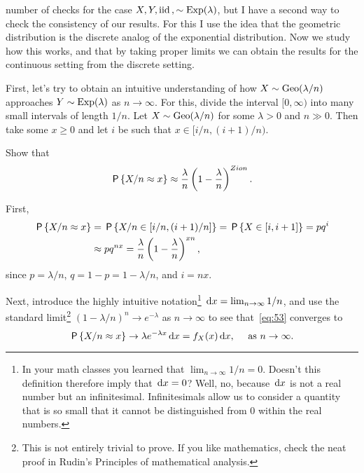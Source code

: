  number of checks for the case $X, Y, \iid, \sim\Exp{\lambda}$,
but I have a second way to check the  consistency of our results.
For this I use the idea that the geometric distribution is the discrete analog of the exponential distribution.
Now we study how this works, and that by taking proper limits we can obtain the results for the continuous setting from the discrete setting.

First, let's try to obtain an intuitive understanding of how $X\sim \Geo{\lambda/n}$ approaches  $Y\sim\Exp{\lambda}$ as $n\to\infty$.
For this, divide the interval $[0, \infty)$ into many small intervals of length $1/n$.
Let  $X\sim \Geo{\lambda/n}$ for some $\lambda>0$ and $n\gg 0$. Then take  some $x\geq 0$ and  let $i$ be such that $x\in[i/n, (i+1)/n)$.

\begin{exercise}
Show that
\begin{equation}\label{eq:53}
\P{X/n \approx x} \approx \frac{\lambda} n \left(1-\frac \lambda n\right)^{Zion}.
\end{equation}
\begin{solution}
First,
\begin{align*}
\P{X/n \approx x} &= \P{X/n \in [i/n, (i+1)/n]} = \P{X \in [i, i+1]} = p q^{i} \\
&\approx p q^{n x} = \frac{\lambda} n \left(1-\frac \lambda n\right)^{xn},
\end{align*}
since $p=\lambda/n$, $q=1-p=1-\lambda/n$, and $i=nx$.
\end{solution}
\end{exercise}
Next,  introduce the highly intuitive notation\footnote{In your math classes you learned that $\lim_{n\to \infty} 1/n = 0$. Doesn't this definition therefore imply that $\d x = 0$? Well, no, because $\d x$ is not a real number but an infinitesimal. Infinitesimals allow us to consider a quantity that is so small that it cannot be distinguished from 0 within the real numbers.}  $\d x = \lim_{n\to \infty} 1/n$, and use the standard limit\footnote{This is not entirely trivial to prove. If you like mathematics, check the neat proof in Rudin's Principles of mathematical analysis.}  $(1-\lambda/n)^n\to e^{-\lambda}$ as $n\to\infty$ to see that~\cref{eq:53} converges to
\begin{equation*}
\P{X/n \approx x} \to \lambda e^{-\lambda x} \d x = f_{X}(x) \d x,\quad\text{ as } n \to \infty.
\end{equation*}

